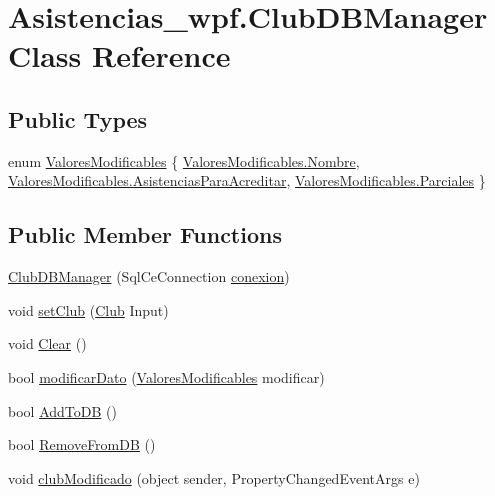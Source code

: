 \hypertarget{class_asistencias__wpf_1_1_club_d_b_manager}{\section{Asistencias\-\_\-wpf.\-Club\-D\-B\-Manager Class Reference}
\label{class_asistencias__wpf_1_1_club_d_b_manager}
}
\subsection*{Public Types}
\begin{DoxyCompactItemize}
\item 
enum \hyperlink{class_asistencias__wpf_1_1_club_d_b_manager_ae652da6f39c8eba7b4a94503cadffed3}{Valores\-Modificables} \{ \hyperlink{class_asistencias__wpf_1_1_club_d_b_manager_ae652da6f39c8eba7b4a94503cadffed3a4777bbaaa0aebe104606b77947d0e22d}{Valores\-Modificables.\-Nombre}, 
\hyperlink{class_asistencias__wpf_1_1_club_d_b_manager_ae652da6f39c8eba7b4a94503cadffed3a8a664c0cc74036f4754b43ee0e7fcb65}{Valores\-Modificables.\-Asistencias\-Para\-Acreditar}, 
\hyperlink{class_asistencias__wpf_1_1_club_d_b_manager_ae652da6f39c8eba7b4a94503cadffed3a0aa43ef473f73c164749e8c55fcdfbba}{Valores\-Modificables.\-Parciales}
 \}
\end{DoxyCompactItemize}
\subsection*{Public Member Functions}
\begin{DoxyCompactItemize}
\item 
\hyperlink{class_asistencias__wpf_1_1_club_d_b_manager_a85668efa7acd109d5b2b77e7b537d045}{Club\-D\-B\-Manager} (Sql\-Ce\-Connection \hyperlink{class_asistencias__wpf_1_1_club_d_b_manager_a61a2cc885a203121fabe30817fc97b76}{conexion})
\item 
void \hyperlink{class_asistencias__wpf_1_1_club_d_b_manager_ad8f732dac6e7e24f8aca1db7ba30f889}{set\-Club} (\hyperlink{class_asistencias__wpf_1_1_club}{Club} Input)
\item 
void \hyperlink{class_asistencias__wpf_1_1_club_d_b_manager_aa88b7e814902986495da9c8a10e757a4}{Clear} ()
\item 
bool \hyperlink{class_asistencias__wpf_1_1_club_d_b_manager_a41a477a787519e172ca6ed35cc59b70d}{modificar\-Dato} (\hyperlink{class_asistencias__wpf_1_1_club_d_b_manager_ae652da6f39c8eba7b4a94503cadffed3}{Valores\-Modificables} modificar)
\item 
bool \hyperlink{class_asistencias__wpf_1_1_club_d_b_manager_a9af31ceb61def7fcb99e9bc6ba7ba76f}{Add\-To\-D\-B} ()
\item 
bool \hyperlink{class_asistencias__wpf_1_1_club_d_b_manager_a43bdb85e75c657608eb07d815cfb7c5e}{Remove\-From\-D\-B} ()
\item 
void \hyperlink{class_asistencias__wpf_1_1_club_d_b_manager_aca2513219d61f9701e1ac3aedf57c131}{club\-Modificado} (object sender, Property\-Changed\-Event\-Args e)
\end{DoxyCompactItemize}
